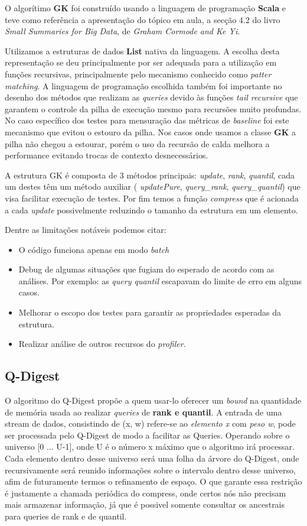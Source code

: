 \documentclass[11pt]{article}
\begin{document}
O algorítimo \textbf{GK} foi construído usando a linguagem de programação \textbf{Scala} e teve como referência a apresentação do tópico em aula, a secção 4.2 do livro \emph{Small Summaries for Big Data}, de \emph{Graham Cormode and Ke Yi}.

Utilizamos a estruturas de dados \textbf{List} nativa da linguagem. A escolha desta representação se deu principalmente por ser adequada para a utilização em funções recursivas, principalmente pelo mecanismo conhecido como \emph{patter matching}. A linguagem de programação escolhida também foi importante no desenho dos métodos que realizam as \emph{queries} devido às funções \emph{tail recursive} que garantem o controle da pilha de execução mesmo para recursões muito profundas. No caso específico dos testes para mensuração das métricas de \emph{baseline} foi este mecanismo que evitou o estouro da pilha. Nos casos onde usamos a classe \textbf{GK} a pilha não chegou a estourar, porém o uso da recursão de calda melhora a performance evitando trocas de contexto desnecessários.

A estrutura GK é composta de 3 métodos principais: \emph{update}, \emph{rank}, \emph{quantil}, cada um destes têm um método auxiliar ( \emph{updatePure}, \emph{query\_rank}, \emph{query\_quantil}) que visa facilitar execução de testes. Por fim temos a função \emph{compress} que é acionada a cada \emph{update} possivelmente reduzindo o tamanho da estrutura em um elemento.

Dentre as limitações notáveis podemos citar:

\begin{itemize}
  \item O código funciona apenas em modo \emph{batch}
  \item Debug de algumas situações que fugiam do esperado de acordo com as análises. Por exemplo: as \emph{query quantil} escapavam do limite de erro em alguns casos.
  \item Melhorar o escopo dos testes para garantir as propriedades esperadas da estrutura.
  \item Realizar análise de outros recursos do \emph{profiler}.
\end{itemize}

\subsection{Q-Digest}
    O algoritmo do Q-Digest propõe a quem usar-lo oferecer um \textit{bound} na quantidade de memória usada ao realizar \textit{queries} de \textbf{rank e quantil}. A entrada de uma stream de dados, consistindo de (x, w) refere-se ao \textit{elemento x} com \textit{peso w}, pode ser processada pelo Q-Digest de modo a facilitar as Queries. Operando sobre o universo [0 ... U-1], onde U é o número x máximo que o algoritmo irá processar. Cada elemento dentro desse universo será uma folha da árvore do Q-Digest, onde recursivamente será reunido informações sobre o intervalo dentro desse universo, afim de futuramente termos o refinamento de espaço. O que garante essa restrição é justamente a chamada periódica do compress, onde certos nós não precisam mais armazenar informação, já que é possivel somente consultar os ancestrais para queries de rank e de quantil.
    
\end{document}
